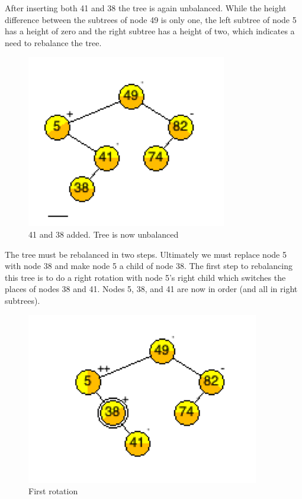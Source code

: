 After inserting both 41 and 38 the tree is again unbalanced. While the height difference between the subtrees of node 49 is only one, the left subtree of node 5 has a height of zero and the right subtree has a height of two, which indicates a need to rebalance the tree.

\begin{figure}[H]
\centering
\includegraphics{pictures/tree4.png}
\caption{41 and 38 added. Tree is now unbalanced}
\label{fig:tree4}
\end{figure}

The tree must be rebalanced in two steps. Ultimately we must replace node 5 with node 38 and make node 5 a child of node 38. The first step to rebalancing this tree is to do a right rotation with node 5's right child which switches the places of nodes 38 and 41. Nodes 5, 38, and 41 are now in order (and all in right subtrees).

\begin{figure}[H]
\centering
\includegraphics{pictures/tree5.png}
\caption{First rotation}
\label{fig:tree5}
\end{figure}

